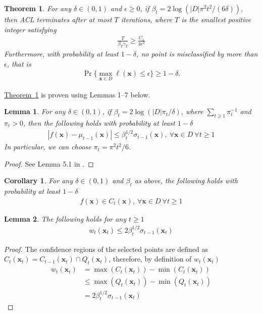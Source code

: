 \documentclass{article}
\def\*#1{\bm{#1}}
\newcommand{\theoremref}[1]{\hyperref[#1]{\mbox{Theorem~\ref*{#1}}}}
\newtheorem{theorem}{Theorem}
\newtheorem{lemma}{Lemma}
\newtheorem{cor}{Corollary}
\begin{document}
\begin{theorem}
\label{thm:acl}
For any $\delta \in (0, 1)$ and $\epsilon \geq 0$,
if $\beta_t = 2\log(|D|\pi^2 t^2/(6\delta))$, then ACL terminates after
at most $T$ iterations, where $T$ is the smallest positive integer
satisfying
\begin{align*}
\frac{T}{\beta_T \gamma_T} \geq \frac{C_1}{4\epsilon^2}
\end{align*}
Furthermore, with probability at least $1-\delta$, no point is
misclassified by more than $\epsilon$, that is
\begin{align*}
\Pr\{\max_{\*x\in D}\ell(\*x) \leq \epsilon\} \geq 1 - \delta.
\end{align*}
\end{theorem}

\theoremref{thm:acl} is proven using Lemmas 1--7 below.

\begin{lemma}
\label{lem:srin1}
For any $\delta \in (0, 1)$, if $\beta_t = 2\log(|D|\pi_t/\delta)$, where
$\sum_{t\geq1}\pi_t^{-1}$ and $\pi_t > 0$, then the following holds with
probability at least $1-\delta$
\begin{align*}
|f(\*x) - \mu_{t-1}(\*x)| \leq \beta_t^{1/2}\sigma_{t-1}(\*x),\ \forall \*x \in D\ \forall t \geq 1
\end{align*}
In particular, we can choose $\pi_t = \pi^2 t^2/6$.
\end{lemma}
\begin{proof}
See Lemma 5.1 in \cite{srinivas2010}.
\end{proof}

\begin{cor}
\label{cor:cs}
For any $\delta \in (0, 1)$ and $\beta_t$ as above, the following holds
with probability at least $1-\delta$
\begin{align*}
f(\*x) \in C_t(\*x),\ \forall \*x \in D\ \forall t \geq 1
\end{align*}
\end{cor}

\begin{lemma}
\label{lem:wb}
The following holds for any $t \geq 1$
\begin{align*}
w_t(\*x_t) \leq 2\beta_t^{1/2}\sigma_{t-1}(\*x_t)
\end{align*}
\end{lemma}
\begin{proof}
The confidence regions of the selected points are defined as
$C_t(\*x_t) = C_{t-1}(\*x_t) \cap Q_t(\*x_t)$, therefore, by
definition of $w_t(\*x_t)$
\begin{align*}
w_t(\*x_t) &= \max(C_t(\*x_t)) - \min(C_t(\*x_t))\\
&\leq \max(Q_t(\*x_t)) - \min(Q_t(\*x_t))\\
&=2\beta_t^{1/2}\sigma_{t-1}(\*x_t)
\end{align*}
\end{proof}
\end{document}
